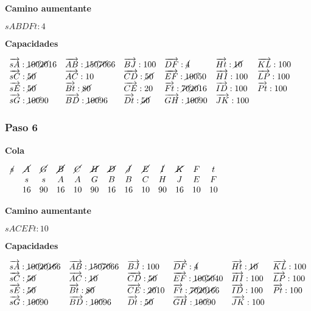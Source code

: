 \documentclass[10pt,a4paper]{article}
\begin{document}
\textbf{Camino aumentante}

$sABDFt:4$

\textbf{Capacidades}

$\begin{array}{llllll} \overrightarrow{sA}: \cancel{100}\cancel{20}16& \overrightarrow{AB}: \cancel{150} \cancel{70}66&\overrightarrow{BJ}: 100&\overrightarrow{DF}: \cancel{4}&\overrightarrow{Ht}: \cancel{10}&\overrightarrow{KL}: 100\\ \overrightarrow{sC}: \cancel{50}& \overrightarrow{AC}: 10&\overrightarrow{CD}: \cancel{50}&\overrightarrow{EF}: \cancel{100}50&\overrightarrow{HI}: 100&\overrightarrow{LP}: 100\\ \overrightarrow{sE}: \cancel{50}& \overrightarrow{Bt}: \cancel{80}&\overrightarrow{CE}: 20&\overrightarrow{Ft}: \cancel{70}\cancel{20}16&\overrightarrow{ID}: 100&\overrightarrow{Pt}: 100\\ \overrightarrow{sG}: \cancel{100}90& \overrightarrow{BD}: \cancel{100}96&\overrightarrow{Dt}: \cancel{50}&\overrightarrow{GH}: \cancel{100}90&\overrightarrow{JK}: 100&\\ \end{array}$

\subsubsection*{Paso 6}

\textbf{Cola}

$\begin{array}{cccccccccccccc} \cancel{s} & \cancel{A} & \cancel{G} & \cancel{B} & \cancel{C} & \cancel{H} & \cancel{D} & \cancel{J} & \cancel{E} & \cancel{I} & \cancel{K} & F& t\\ & s & s & A & A & G & B &B & C & H & J & E &F\\ & 16 & 90 & 16 & 10 & 90&16& 16 & 10 & 90 & 16 & 10 &10 \end{array}$

\textbf{Camino aumentante}

$sACEFt:10$

\textbf{Capacidades}

$\begin{array}{llllll} \overrightarrow{sA}: \cancel{100}\cancel{20}\cancel{16}6& \overrightarrow{AB}: \cancel{150} \cancel{70}66&\overrightarrow{BJ}: 100&\overrightarrow{DF}: \cancel{4}&\overrightarrow{Ht}: \cancel{10}&\overrightarrow{KL}: 100\\ \overrightarrow{sC}: \cancel{50}& \overrightarrow{AC}: \cancel{10}&\overrightarrow{CD}: \cancel{50}&\overrightarrow{EF}: \cancel{100}\cancel{50}40&\overrightarrow{HI}: 100&\overrightarrow{LP}: 100\\ \overrightarrow{sE}: \cancel{50}& \overrightarrow{Bt}: \cancel{80}&\overrightarrow{CE}: \cancel{20}10 &\overrightarrow{Ft}: \cancel{70}\cancel{20}\cancel{16}6&\overrightarrow{ID}: 100&\overrightarrow{Pt}: 100\\ \overrightarrow{sG}: \cancel{100}90& \overrightarrow{BD}: \cancel{100}96&\overrightarrow{Dt}: \cancel{50}&\overrightarrow{GH}: \cancel{100}90&\overrightarrow{JK}: 100&\\ \end{array}$
\end{document}
